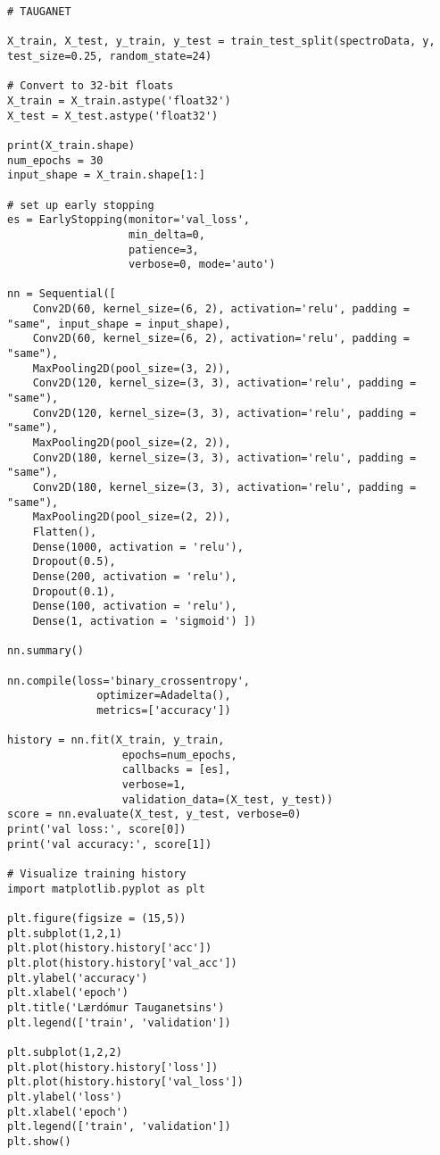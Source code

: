 \documentclass[11pt]{article}
\begin{document}
\begin{verbatim}
# TAUGANET

X_train, X_test, y_train, y_test = train_test_split(spectroData, y, test_size=0.25, random_state=24)

# Convert to 32-bit floats
X_train = X_train.astype('float32')
X_test = X_test.astype('float32')

print(X_train.shape)
num_epochs = 30
input_shape = X_train.shape[1:]

# set up early stopping
es = EarlyStopping(monitor='val_loss',
                   min_delta=0,
                   patience=3,
                   verbose=0, mode='auto')

nn = Sequential([ 
    Conv2D(60, kernel_size=(6, 2), activation='relu', padding = "same", input_shape = input_shape),
    Conv2D(60, kernel_size=(6, 2), activation='relu', padding = "same"),
    MaxPooling2D(pool_size=(3, 2)),
    Conv2D(120, kernel_size=(3, 3), activation='relu', padding = "same"),
    Conv2D(120, kernel_size=(3, 3), activation='relu', padding = "same"),
    MaxPooling2D(pool_size=(2, 2)),
    Conv2D(180, kernel_size=(3, 3), activation='relu', padding = "same"),
    Conv2D(180, kernel_size=(3, 3), activation='relu', padding = "same"),
    MaxPooling2D(pool_size=(2, 2)),
    Flatten(),
    Dense(1000, activation = 'relu'),
    Dropout(0.5),
    Dense(200, activation = 'relu'),
    Dropout(0.1),
    Dense(100, activation = 'relu'),
    Dense(1, activation = 'sigmoid') ])

nn.summary()

nn.compile(loss='binary_crossentropy',
              optimizer=Adadelta(),
              metrics=['accuracy'])

history = nn.fit(X_train, y_train,
                  epochs=num_epochs,
                  callbacks = [es],
                  verbose=1,
                  validation_data=(X_test, y_test))
score = nn.evaluate(X_test, y_test, verbose=0)
print('val loss:', score[0])
print('val accuracy:', score[1])

# Visualize training history 
import matplotlib.pyplot as plt

plt.figure(figsize = (15,5))
plt.subplot(1,2,1)
plt.plot(history.history['acc'])
plt.plot(history.history['val_acc'])
plt.ylabel('accuracy')
plt.xlabel('epoch')
plt.title('Lærdómur Tauganetsins')
plt.legend(['train', 'validation'])

plt.subplot(1,2,2)
plt.plot(history.history['loss'])
plt.plot(history.history['val_loss'])
plt.ylabel('loss')
plt.xlabel('epoch')
plt.legend(['train', 'validation'])
plt.show()
\end{verbatim}
\newpage
\end{document}

